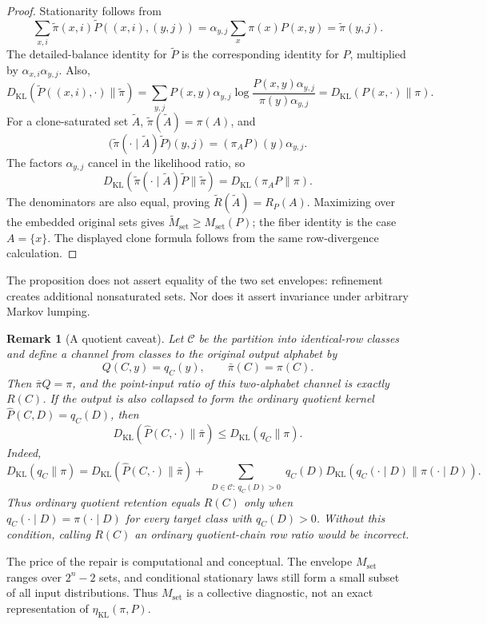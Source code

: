\documentclass[11pt]{article}
\newtheorem{remark}[theorem]{Remark}
\newcommand{\KL}{D_{\mathrm{KL}}}
\newcommand{\etaStat}{\eta_{\mathrm{KL}}(\pi,P)}
\newcommand{\Mset}{M_{\mathrm{set}}}
\begin{document}
\begin{proof}
Stationarity follows from
\[
  \sum_{x,i}\widetilde\pi(x,i)
  \widetilde P((x,i),(y,j))
  =
  \alpha_{y,j}\sum_x\pi(x)P(x,y)
  =\widetilde\pi(y,j).
\]
The detailed-balance identity for \(\widetilde P\) is the corresponding
identity for \(P\), multiplied by
\(\alpha_{x,i}\alpha_{y,j}\).  Also,
\[
  \KL(\widetilde P((x,i),\cdot)\|\widetilde\pi)
  =
  \sum_{y,j}P(x,y)\alpha_{y,j}
  \log\frac{P(x,y)\alpha_{y,j}}
           {\pi(y)\alpha_{y,j}}
  =
  \KL(P(x,\cdot)\|\pi).
\]
For a clone-saturated set \(\widetilde A\),
\(\widetilde\pi(\widetilde A)=\pi(A)\), and
\[
  \bigl(\widetilde\pi(\cdot\mid\widetilde A)\widetilde P\bigr)(y,j)
  =(\pi_AP)(y)\alpha_{y,j}.
\]
The factors \(\alpha_{y,j}\) cancel in the likelihood ratio, so
\[
  \KL(\widetilde\pi(\cdot\mid\widetilde A)\widetilde P
      \|\widetilde\pi)
  =\KL(\pi_AP\|\pi).
\]
The denominators are also equal, proving
\(\widetilde R(\widetilde A)=R_P(A)\).  Maximizing over the embedded
original sets gives
\(\widetilde M_{\mathrm{set}}\ge M_{\mathrm{set}}(P)\); the fiber identity
is the case \(A=\{x\}\).  The displayed clone formula follows from the
same row-divergence calculation.
\end{proof}

The proposition does not assert equality of the two set envelopes:
refinement creates additional nonsaturated sets.  Nor does it assert
invariance under arbitrary Markov lumping.

\begin{remark}[A quotient caveat]
\label{rmk:quotient-caveat}
Let \(\mathcal C\) be the partition into identical-row classes and define
a channel from classes to the original output alphabet by
\[
  Q(C,y)=q_C(y),\qquad \bar\pi(C)=\pi(C).
\]
Then \(\bar\pi Q=\pi\), and the point-input ratio of this two-alphabet
channel is exactly \(R(C)\).  If the output is also collapsed to form the
ordinary quotient kernel
\(\widehat P(C,D)=q_C(D)\), then
\[
  \KL(\widehat P(C,\cdot)\|\bar\pi)
  \le\KL(q_C\|\pi).
\]
Indeed,
\[
  \KL(q_C\|\pi)
  =
  \KL(\widehat P(C,\cdot)\|\bar\pi)
  +\sum_{\substack{D\in\mathcal C:\ q_C(D)>0}}q_C(D)
    \KL(q_C(\cdot\mid D)\|\pi(\cdot\mid D)).
\]
Thus ordinary quotient retention equals \(R(C)\) only when
\(q_C(\cdot\mid D)=\pi(\cdot\mid D)\) for every target class with
\(q_C(D)>0\).  Without this condition, calling \(R(C)\) an ordinary
quotient-chain row ratio would be incorrect.
\end{remark}

The price of the repair is computational and conceptual.  The envelope
\(\Mset\) ranges over \(2^n-2\) sets, and conditional stationary laws still
form a small subset of all input distributions.  Thus \(\Mset\) is a
collective diagnostic, not an exact representation of \(\etaStat\).
\end{document}

